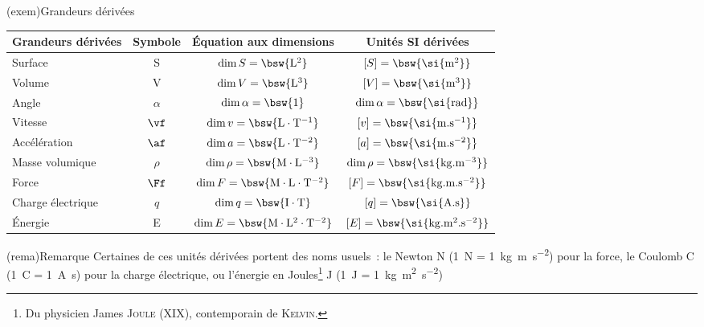 \documentclass[../main/main.tex]{subfiles}
\begin{document}
\begin{tcb}[label=exem:grandeurs](exem){Grandeurs dérivées}
	\begin{center}
		\begin{tabular}{lccc}
			\toprule
			Grandeurs dérivées & Symbole  & Équation aux dimensions                           & Unités SI dérivées                              \\
			\midrule
			Surface            & S        & $\dim{S} \rm      = \bsw{L^2}$                    & $ [S] \rm      = \bsw{\si{m^2}}           $     \\
			Volume             & V        & $\dim{V} \rm      = \bsw{L^3}$                    & $ [V] \rm      = \bsw{\si{m^3}}           $     \\
			Angle              & $\alpha$ & $\dim{\alpha} \rm = \bsw{1}$                      & $ \dim{\alpha} \rm = \bsw{\si{rad}}           $ \\
			Vitesse            & $\vf$    & $\dim{v} \rm      = \bsw{L\cdot T^{-1}}$          & $ [v] \rm      = \bsw{\si{m.s^{-1}}}      $     \\
			Accélération       & $\af$    & $\dim{a} \rm      = \bsw{L\cdot T^{-2}}$          & $ [a] \rm      = \bsw{\si{m.s^{-2}}}      $     \\
			Masse volumique    & $\rho$   & $\dim{\rho} \rm   = \bsw{M\cdot L^{-3}}$          & $ \dim{\rho} \rm   = \bsw{\si{kg.m^{-3}}}     $ \\
			Force              & $\Ff$    & $\dim{F} \rm      = \bsw{M\cdot L\cdot T^{-2}}$   & $ [F] \rm      = \bsw{\si{kg.m.s^{-2}}}   $     \\
			Charge électrique  & $q$      & $\dim{q} \rm      = \bsw{I\cdot T}$               & $ [q] \rm      = \bsw{\si{A.s}}           $     \\
			Énergie            & E        & $\dim{E} \rm      = \bsw{M\cdot L^2\cdot T^{-2}}$ & $ [E] \rm      = \bsw{\si{kg.m^2.s^{-2}}} $     \\
			\bottomrule
		\end{tabular}
	\end{center}
\end{tcb}
\begin{tcb}(rema){Remarque}
	Certaines de ces unités dérivées portent des noms usuels~: le Newton N
	(\SI{1}{N} = \SI{1}{kg.m.s^{-2}}) pour la force, le Coulomb C (\SI{1}{C} =
	\SI{1}{A.s}) pour la charge électrique, ou l'énergie en Joules\footnote{Du
		physicien James \textsc{Joule} (XIX\ieme), contemporain de \textsc{Kelvin}.}
	J (\SI{1}{J} = \SI{1}{kg.m^2.s^{-2}})
\end{tcb}
\end{document}
